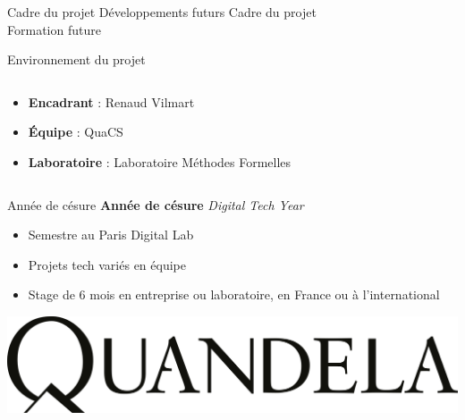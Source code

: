 \begin{frame}{Cadre du projet Développements futurs}
  \huge{Cadre du projet \\ Formation future}
\end{frame}

\begin{frame}{Environnement du projet}
  \begin{columns}
      \begin{column}{0.6\textwidth}
          \begin{itemize}
              \item \textbf{Encadrant} : Renaud Vilmart
              \item \textbf{Équipe} : QuaCS
              \item \textbf{Laboratoire} : Laboratoire Méthodes Formelles
          \end{itemize}
      \end{column}
      \begin{column}{0.4\textwidth}
          \begin{center}
              
              \vspace{0.5cm}
              
          \end{center}
      \end{column}
  \end{columns}
\end{frame}

\begin{frame}{Année de césure}
  \textbf{Année de césure} \textit{Digital Tech Year}
  \begin{itemize}
    \item Semestre au Paris Digital Lab
    \item Projets tech variés en équipe
    \item Stage de 6 mois en entreprise ou laboratoire, en France ou à l'international
  \end{itemize}

  \pause

  \vspace{1em}
  
  \hfill{}
  
  \hfill{}
  \includegraphics[width=.25\textwidth]{./images/quandela-logo.png}
\end{frame}

